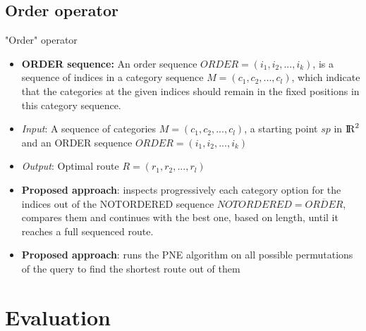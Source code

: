 \documentclass[18pt]{beamer}
\begin{document}
	\subsection{Order operator}
		\begin{frame}{"Order" operator}
		
			\begin{itemize}
				\item \textbf{ORDER sequence:} An order sequence $ORDER = (i_1, i_2, ..., i_k)$, is a sequence of indices in a category sequence $M = (c_1, c_2, ..., c_l)$, which indicate that the categories at the given indices should remain in the fixed positions in this category sequence.
				\item \textit{Input}: A sequence of categories $M = (c_1, c_2, ..., c_l)$, a starting point $sp$ in ${\rm I\!R}^2$ and an ORDER sequence $ORDER = (i_1, i_2, ..., i_k)$
				\item \textit{Output}: Optimal route $R = (r_1, r_2, ..., r_l)$ \newline
				\pause
				\item \textbf{Proposed approach}: inspects progressively each category option for the indices out of the NOTORDERED sequence $NOTORDERED = \overline{ORDER}$, compares them and continues with the best one, based on length, until it reaches a full sequenced route.
				\item \textbf{Proposed approach}: runs the PNE algorithm on all possible permutations of the query to find the shortest route out of them
			\end{itemize}
		
		\end{frame}
	
	
\section{Evaluation}
\end{document}
